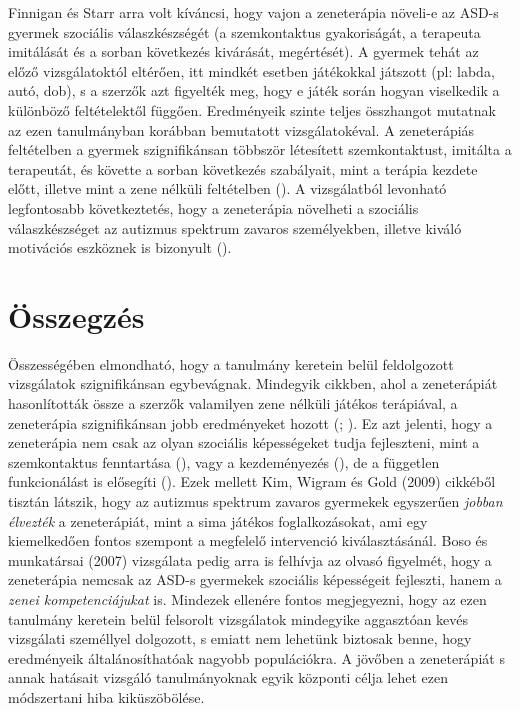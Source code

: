 Finnigan és Starr arra volt kíváncsi, hogy vajon a zeneterápia növeli-e az ASD-s gyermek szociális válaszkészségét (a szemkontaktus gyakoriságát, a terapeuta imitálá\-sát és a sorban  következés kivárását, megértését). A gyermek tehát az előző vizsgála\-toktól eltérően, itt mindkét esetben játékokkal játszott (pl: labda, autó, dob), s a szerzők azt figyelték meg, hogy e játék során hogyan viselkedik a különböző feltételektől függően. Eredményeik szinte teljes összhangot mutatnak az ezen tanulmányban korábban bemutatott vizsgálatokéval. A zeneterápiás feltételben a gyermek szignifikánsan többször létesí\-tett szemkontaktust, imitálta a terapeutát, és követte a sorban következés szabályait, mint a terápia kezdete előtt, illetve mint a zene nélküli feltételben (\cite{finnigan_starr_2010}). A vizsgálatból levonható legfontosabb következtetés, hogy a zeneterápia növelheti a szociális válaszkészséget az autizmus spektrum zavaros személyekben, illetve kiváló motivációs eszköznek is bizonyult (\cite{finnigan_starr_2010}).
\pagebreak

\section{Összegzés}

Összességében elmondható, hogy a tanulmány keretein belül feldolgozott vizsgálatok szignifikánsan egybevágnak. Mindegyik cikkben, ahol a zeneterápiát hasonlították össze a szerzők valamilyen zene nélküli játékos terápiával, a zeneterápia szignifikánsan jobb eredményeket hozott (\cite{finnigan_starr_2010}; \cite{kim_wigram_gold_2009}). Ez azt jelenti, hogy a zeneterápia nem csak az olyan szociális képességeket  tudja fejleszteni, mint a szemkontaktus fenntartása (\cite{finnigan_starr_2010}), vagy a kezdeményezés (\cite{kim_wigram_gold_2009}), de a független funkcionálást is elősegíti (\cite{kern_wolery_aldridge_2006}). Ezek mellett Kim, Wigram és Gold (2009) cikkéből tisztán látszik, hogy az autizmus spektrum zavaros gyermekek egyszerűen \textit{jobban élvezték} a zeneterápiát, mint a sima játékos foglalkozásokat, ami egy kiemelkedően fontos szempont a megfelelő intervenció kiválasztásánál. Boso és munkatársai (2007) vizsgálata pedig arra is felhívja az olvasó figyelmét, hogy a zeneterápia nemcsak az ASD-s gyermekek szociális képességeit fejleszti, hanem a \textit{zenei kompetenciájukat} is. Mindezek ellenére fontos megjegyezni, hogy az ezen tanulmány keretein belül felsorolt vizsgálatok mindegyike aggasztóan kevés vizsgálati személlyel dolgozott, s emiatt nem lehetünk biztosak benne, hogy eredményeik általánosíthatóak nagyobb populációkra. A jövőben a zeneterápiát s annak hatásait vizsgáló tanulmányoknak egyik központi célja lehet ezen módszertani hiba kiküszöbölése.